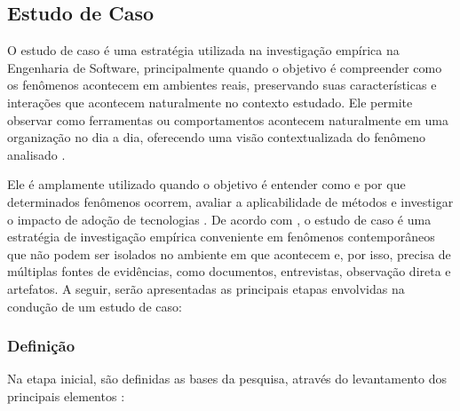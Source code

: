 \subsection{Estudo de Caso}

O estudo de caso é uma estratégia utilizada na investigação empírica na Engenharia de Software, principalmente quando o objetivo é compreender como os fenômenos acontecem em ambientes reais, preservando suas características e interações que acontecem naturalmente no contexto estudado. Ele permite observar como ferramentas ou comportamentos acontecem naturalmente em uma organização no dia a dia, oferecendo uma visão contextualizada do fenômeno analisado \cite{runeson_case_study_2012, Wohlin:2012:ESE:2349018}.

Ele é amplamente utilizado quando o objetivo é entender como e por que determinados fenômenos ocorrem, avaliar a aplicabilidade de métodos e investigar o impacto de adoção de tecnologias \cite{runeson_case_study_2012, Wohlin:2012:ESE:2349018}. De acordo com , o estudo de caso é uma estratégia de investigação empírica conveniente em fenômenos contemporâneos que não podem ser isolados no ambiente em que acontecem e, por isso, precisa de múltiplas fontes de evidências, como documentos, entrevistas, observação direta e artefatos. A seguir, serão apresentadas as principais etapas envolvidas na condução de um estudo de caso:

\subsubsection{Definição}
Na etapa inicial, são definidas as bases da pesquisa, através do levantamento dos principais elementos \cite{runeson_case_study_2012}:

